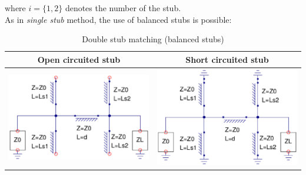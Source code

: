 \noindent where $i=\lbrace 1,2 \rbrace$ denotes the number of the stub.\\

\noindent As in \textit{single stub} method, the use of balanced stubs is possible:

\begin{table}[H]
  \centering
  \begin{tabular}{ | c | c | }
    \hline
    Open circuited stub & Short circuited stub\\ \hline
    \begin{minipage}{.4\textwidth}
      \includegraphics[width=\linewidth]{./images/Synthesis/Impedance_Matching/DoubleStubOpenBalanced}
    \end{minipage}
    &
    \begin{minipage}{.4\textwidth}
      \includegraphics[width=\linewidth]{./images/Synthesis/Impedance_Matching/DoubleStubShortBalanced}
    \end{minipage}
    \\ \hline
  \end{tabular}
  \caption{Double stub matching (balanced stubs)}\label{tbl:dblstubbalanced}
\end{table}

